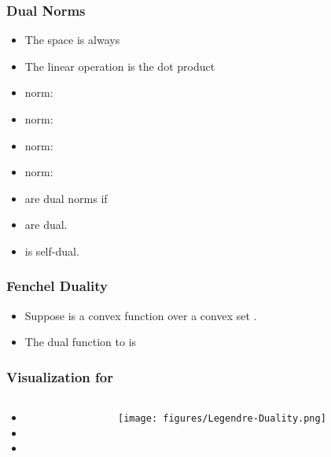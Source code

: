 \documentclass[handout]{beamer}
\begin{document}
\begin{frame}
\frametitle{Dual Norms}
\begin{itemize}
  \item The space is always 
  \item The linear operation is the dot product \R{$\vu \cdot \vv$}
\item {} norm: 
\item {} norm: 
\item {} norm: 
\item {} norm: 
\item {} are dual norms if 
\item {} are dual.
\item {} is self-dual. 
\end{itemize}
\end{frame}

\begin{frame}
\frametitle{Fenchel Duality}
\begin{itemize}
\item Suppose  is a convex function over a convex set .
\item The dual function to  is
\end{itemize}
\end{frame}

\begin{frame}
  \frametitle{Visualization for \R{$\real$}}
  \begin{columns}
    \begin{column}{0.55\textwidth}
        \begin{itemize}
            \item {}
            \item {}
            \item {}
        \end{itemize}
    \end{column}
    \begin{column}{0.43\textwidth}
          \texttt{[image: figures/Legendre-Duality.png]}
    \end{column}
\end{columns}
\end{frame}
\end{document}
